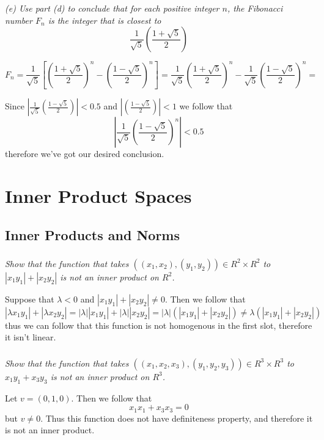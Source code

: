 \documentclass[11pt,oneside,titlepage]{book}
\begin{document}
\textit{(e) Use part (d) to conclude that for each positive integer $n$, the Fibonacci
  number $F_n$ is the integer that is closest to}
$$\frac{1}{\sqrt{5}}\left(\frac{1 + \sqrt{5}}{2}\right)$$

$$F_n = \frac{1}{\sqrt{5}}\left[\left(\frac{1 + \sqrt{5}}{2}\right)^n -
  \left(\frac{1 - \sqrt{5}}{2}\right)^n \right] =
\frac{1}{\sqrt{5}}\left(\frac{1 + \sqrt{5}}{2}\right)^n -
\frac{1}{\sqrt{5}} \left(\frac{1 - \sqrt{5}}{2}\right)^n  = $$

Since $|\frac{1}{\sqrt{5}} \left(\frac{1 - \sqrt{5}}{2}\right)| < 0.5$ and
$|\left(\frac{1 - \sqrt{5}}{2}\right)| < 1$ we follow that
$$|\frac{1}{\sqrt{5}} \left(\frac{1 - \sqrt{5}}{2}\right)^n| < 0.5 $$
therefore we've got our desired conclusion.

\chapter{Inner Product Spaces}

\section{Inner Products and Norms}

\subsection{}

\textit{Show that the function that takes $((x_1, x_2), (y_1, y_2)) \in R^2 \times R^2$ to
  $|x_1 y_1| + |x_2 y_2|$ is not an inner product on $R^2$.}

Suppose that $\lambda < 0$ and $|x_1 y_1| + |x_2 y_2| \neq 0$. Then we follow that
$$|\lambda x_1 y_1| + |\lambda x_2 y_2| = |\lambda ||x_1 y_1| + |\lambda ||x_2 y_2| =
|\lambda |(|x_1 y_1| + |x_2 y_2|) \neq \lambda (|x_1 y_1| + |x_2 y_2|)$$
thus we can follow that this function is not homogenous in the first slot, therefore it isn't
linear.

\subsection{}

\textit{Show that the function that takes $((x_1, x_2, x_3), (y_1, y_2, y_3)) \in R^3 \times R^3$
  to $x_1 y_1 + x_3 y_3$ is not an inner product on $R^3$.}

Let $v = (0, 1, 0)$. Then we follow that
$$x_1 x_1 + x_3 x_3 = 0$$
but $v \neq 0$. Thus this function does not have definiteness property, and therefore it is not
an inner product.
\end{document}
